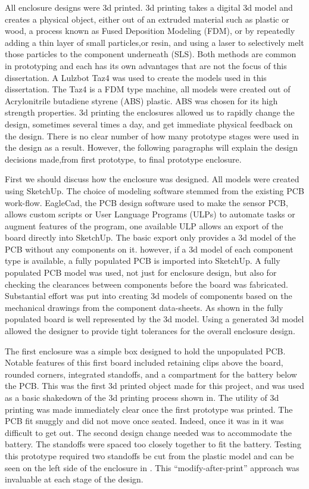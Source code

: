 All enclosure designs were 3d printed. 3d printing takes a digital 3d model and creates a physical object, either out of an extruded material such as plastic or wood, a process known as Fused Deposition Modeling (FDM), or by repeatedly adding a thin layer of small particles,or resin, and using a laser to selectively melt those particles to the component underneath (SLS). Both methods are common in prototyping and each has its own advantages that are not the focus of this dissertation. A Lulzbot Taz4 \cite{LULZBOT} was used to create the models used in this dissertation. The Taz4 is a FDM type machine, all models were created out of Acrylonitrile butadiene styrene (ABS) plastic. ABS was chosen for its high strength properties. 3d printing the enclosures allowed us to rapidly change the design, sometimes several times a day, and get immediate physical feedback on the design. There is no clear number of how many prototype stages were used in the design as a result. However, the following paragraphs will explain the design decisions made,from first prototype, to final prototype enclosure.


First we should discuss how the enclosure was designed. All models were created using SketchUp\cite{Sketchup}. The choice of modeling software stemmed from the existing PCB work-flow. EagleCad, the PCB design software used to make the sensor PCB, allows custom scripts or User Language Programs (ULPs) to automate tasks or augment features of the program, one available ULP allows an export of the board directly into SketchUp. The basic export only provides a 3d model of the PCB without any components on it. however, if a 3d model of each component type is available, a fully populated PCB is imported into SketchUp. A fully populated PCB model was used, not just for enclosure design, but also for checking the clearances between components before the board was fabricated. Substantial effort was put into creating 3d models of components based on the mechanical drawings from the component data-sheets. As shown in  the fully populated board is well represented by the 3d model. Using a generated 3d model allowed the designer to provide tight tolerances for the overall enclosure design. 

The first enclosure was a simple box designed to hold the unpopulated PCB. Notable features of this first board included retaining clips above the board, rounded corners, integrated standoffs, and a compartment for the battery below the PCB. This was the first 3d printed object made for this project, and was used as a basic shakedown of the 3d printing process shown in. The utility of 3d printing was made immediately clear once the first prototype was printed. The PCB fit snuggly and did not move once seated. Indeed, once it was in it was difficult to get out. The second design change needed was to accommodate the battery. The standoffs were spaced too closely together to fit the battery. Testing this prototype required two standoffs be cut from the plastic model and can be seen on the left side of the enclosure in  . This ``modify-after-print'' approach was invaluable at each stage of the design.

